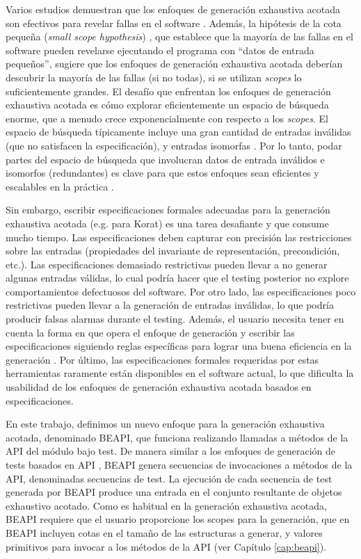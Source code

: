 Varios estudios demuestran que los enfoques de generación exhaustiva acotada son
efectivos para revelar fallas en el software \cite{Marinov01, Khurshid01,
Boyapati02, Sullivan04}. Además, la hipótesis de la cota pequeña (\textit{small
scope hypothesis}) \cite{Andoni02}, que establece que la mayoría de las fallas
en el software pueden revelarse ejecutando el programa con ``datos de entrada
pequeños'', sugiere que los enfoques de generación exhaustiva acotada deberían
descubrir la mayoría de las fallas (si no todas), si se utilizan \textit{scopes}
lo suficientemente grandes. El desafío que enfrentan los enfoques de generación
exhaustiva acotada es cómo explorar eficientemente un espacio de búsqueda
enorme, que a menudo crece exponencialmente con respecto a los \textit{scopes}.
El espacio de búsqueda típicamente incluye una gran cantidad de entradas
inválidas (que no satisfacen la especificación), y entradas isomorfas \cite{Iosif02,Robby03}.
Por lo tanto, podar partes del espacio de búsqueda que involucran datos de entrada 
inválidos e isomorfos (redundantes) es clave para que estos enfoques sean eficientes y 
escalables en la práctica \cite{Boyapati02}.

Sin embargo, escribir especificaciones formales adecuadas para la generación
exhaustiva acotada (e.g. para Korat) es una tarea desafiante y que consume mucho tiempo. Las
especificaciones deben capturar con precisión las restricciones sobre las
entradas (propiedades del invariante de representación, precondición, etc.). 
Las especificaciones demasiado restrictivas pueden llevar a no generar
algunas entradas válidas, lo cual podría hacer que el testing posterior no explore 
comportamientos defectuosos del software. Por otro lado, las especificaciones
poco restrictivas pueden llevar a la generación de entradas inválidas, lo que
podría producir falsas alarmas durante el testing. Además, el usuario necesita 
tener en cuenta la forma en que opera el enfoque de generación y escribir las especificaciones 
siguiendo reglas específicas para lograr una buena eficiencia en la generación \cite{Boyapati02}. 
Por último, las especificaciones formales requeridas por estas herramientas raramente están disponibles 
en el software actual, lo que dificulta la usabilidad de los enfoques de generación exhaustiva 
acotada basados en especificaciones.

En este trabajo, definimos un nuevo enfoque para la generación exhaustiva
acotada, denominado BEAPI, que funciona realizando llamadas a métodos de la API
del módulo bajo test. De manera similar a los enfoques de generación de tests basados en API \cite{Pacheco07, Ma15,Fraser11}, BEAPI genera secuencias de invocaciones a métodos de la API, denominadas secuencias de test. 
La ejecución de cada secuencia de test generada por BEAPI produce una entrada en el conjunto resultante de objetos exhaustivo acotado. 
Como es habitual en la generación exhaustiva acotada, BEAPI requiere que el
usuario proporcione los scopes para la generación, que en BEAPI incluyen cotas
en el tamaño de las estructuras a generar, y valores primitivos para invocar a
los métodos de la API (ver Capítulo \ref{cap:beapi}). 

